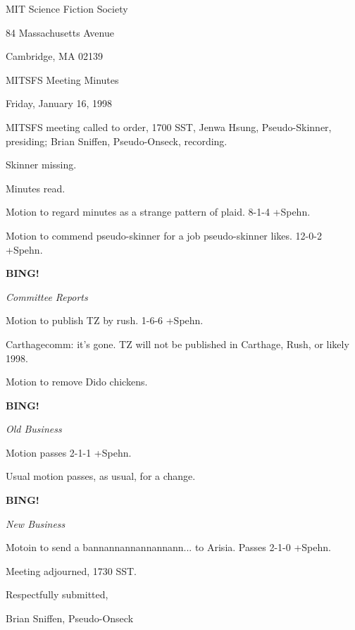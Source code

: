 \documentclass[12pt]{article}
\newcommand{\bing}{{\bf BING!} }
\newcommand{\goto}[1]{\bing \vskip 12pt \centerline{{\em{#1}}}}
\begin{document}
\begin{center}

MIT Science Fiction Society 

84 Massachusetts Avenue

Cambridge, MA 02139

\vspace{12pt}

MITSFS Meeting Minutes 

Friday, January 16, 1998

\end{center}
 
\vspace{18pt}

\setlength{\parskip}{6pt}

\noindent
MITSFS meeting called to order, 1700 SST,
Jenwa Hsung, Pseudo-Skinner, presiding; Brian Sniffen, Pseudo-Onseck, recording.

Skinner missing.

Minutes read.

Motion to regard minutes as a strange pattern of plaid. 8-1-4 +Spehn.

Motion to commend pseudo-skinner for a job pseudo-skinner likes. 12-0-2 +Spehn.

\goto{Committee Reports}

Motion to publish TZ by rush. 1-6-6 +Spehn.

Carthagecomm: it's gone. TZ will not be published in Carthage, Rush, or likely 1998.

Motion to remove Dido chickens.

\goto{Old Business}

Motion passes 2-1-1 +Spehn.

Usual motion passes, as usual, for a change.

\goto{New Business}

Motoin to send a bannannannannannann... to Arisia. Passes 2-1-0 +Spehn.

\vspace{12pt}

\noindent
Meeting adjourned, 1730 SST.

\vspace{18pt}

\centerline{Respectfully submitted,}
\centerline{Brian Sniffen, Pseudo-Onseck}
\end{document}
